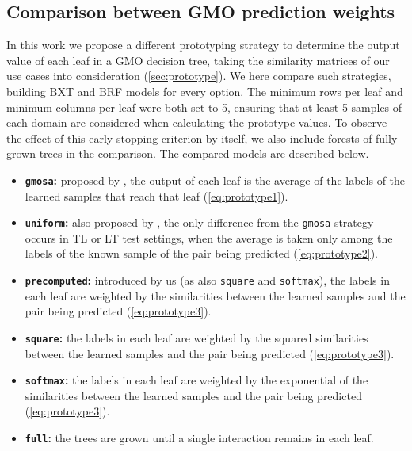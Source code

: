 \subsection{Comparison between GMO prediction weights}
\label{sec:prototype_comparison}

In this work we propose a different prototyping strategy to determine the output value of each leaf in a GMO decision tree, taking the similarity matrices of our use cases into consideration (\autoref{sec:prototype}).
%
We here compare such strategies, building BXT and BRF models for every option. The minimum rows per leaf and minimum columns per leaf were both set to 5, ensuring that at least 5 samples of each domain are considered when calculating the prototype values.
%
To observe the effect of this early-stopping criterion by itself, we also include forests of fully-grown trees in the comparison. The compared models are described below.

\begin{itemize}
    \item \textbf{\texttt{gmosa}:} proposed by \textcite{pliakos2018global}, the output of each leaf is the average of the labels of the learned samples that reach that leaf (\autoref{eq:prototype1}).
    \item \textbf{\texttt{uniform}:} also proposed by \textcite{pliakos2018global}, the only difference from the \texttt{gmosa} strategy occurs in TL or LT test settings, when the average is taken only among the labels of the known sample of the pair being predicted (\autoref{eq:prototype2}).
    \item \textbf{\texttt{precomputed}:} introduced by us (as also \texttt{square} and \texttt{softmax}), the labels in each leaf are weighted by the similarities between the learned samples and the pair being predicted (\autoref{eq:prototype3}).
    \item \textbf{\texttt{square}:} the labels in each leaf are weighted by the squared similarities between the learned samples and the pair being predicted (\autoref{eq:prototype3}).
    \item \textbf{\texttt{softmax}:} the labels in each leaf are weighted by the exponential of the similarities between the learned samples and the pair being predicted (\autoref{eq:prototype3}).
    \item \textbf{\texttt{full}:} the trees are grown until a single interaction remains in each leaf. %
\end{itemize}

